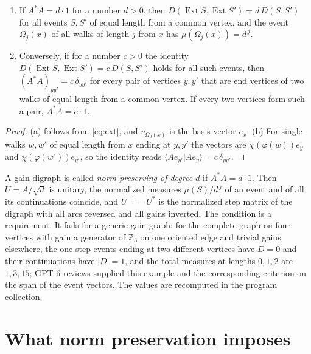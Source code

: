 \begin{lemma}\label{lem:cont}
\begin{enumerate}[label=(\alph*)]
\item If $A^*A=d\cdot1$ for a number $d>0$, then $D(\operatorname{Ext}S,\operatorname{Ext}S')=d\,D(S,S')$ for all events $S,S'$ of equal length from a common vertex, and the event $\Omega_j(x)$ of all walks of length $j$ from $x$ has $\mu(\Omega_j(x))=d^{\,j}$.
\item Conversely, if for a number $c>0$ the identity $D(\operatorname{Ext}S,\operatorname{Ext}S')=c\,D(S,S')$ holds for all such events, then $(A^*A)_{yy'}=c\,\delta_{yy'}$ for every pair of vertices $y,y'$ that are end vertices of two walks of equal length from a common vertex. If every two vertices form such a pair, $A^*A=c\cdot1$.
\end{enumerate}
\end{lemma}
\begin{proof}
(a) follows from \eqref{eq:ext}, and $v_{\Omega_0(x)}$ is the basis vector $e_x$. (b) For single walks $w,w'$ of equal length from $x$ ending at $y,y'$ the vectors are $\chi(\varphi(w))e_y$ and $\chi(\varphi(w'))e_{y'}$, so the identity reads $\langle Ae_{y'}|Ae_y\rangle=c\,\delta_{yy'}$.
\end{proof}

A gain digraph is called \emph{norm-preserving of degree $d$} if $A^*A=d\cdot1$. Then $U=A/\sqrt d$ is unitary, the normalized measures $\mu(S)/d^{\,j}$ of an event and of all its continuations coincide, and $U^{-1}=U^*$ is the normalized step matrix of the digraph with all arcs reversed and all gains inverted. The condition is a requirement. It fails for a generic gain graph: for the complete graph on four vertices with gain a generator of $\mathbb{Z}_3$ on one oriented edge and trivial gains elsewhere, the one-step events ending at two different vertices have $D=0$ and their continuations have $|D|=1$, and the total measures at lengths $0,1,2$ are $1,3,15$; GPT-6 reviews supplied this example and the corresponding criterion on the span of the event vectors. The values are recomputed in the program collection.

\section{What norm preservation imposes}\label{sec:impose}

